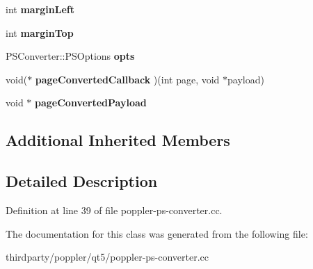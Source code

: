\begin{DoxyCompactItemize}
int {\bfseries margin\+Left}
\item 
\mbox{\label{class_poppler_1_1_p_s_converter_private_adff9e3ea34d848e992c8ce14dffc14f5}} 
int {\bfseries margin\+Top}
\item 
\mbox{\label{class_poppler_1_1_p_s_converter_private_a0d2414c6f9adcaafc02af9a3c29a49bb}} 
P\+S\+Converter\+::\+P\+S\+Options {\bfseries opts}
\item 
\mbox{\label{class_poppler_1_1_p_s_converter_private_a0e47cb6ee255a6d9b8495ee87d72e1e0}} 
void($\ast$ {\bfseries page\+Converted\+Callback} )(int page, void $\ast$payload)
\item 
\mbox{\label{class_poppler_1_1_p_s_converter_private_a4bd37c5d43ba591035e61928c6bf06c6}} 
void $\ast$ {\bfseries page\+Converted\+Payload}
\end{DoxyCompactItemize}
\subsection*{Additional Inherited Members}


\subsection{Detailed Description}


Definition at line 39 of file poppler-\/ps-\/converter.\+cc.



The documentation for this class was generated from the following file\+:\begin{DoxyCompactItemize}
\item 
thirdparty/poppler/qt5/poppler-\/ps-\/converter.\+cc\end{DoxyCompactItemize}
